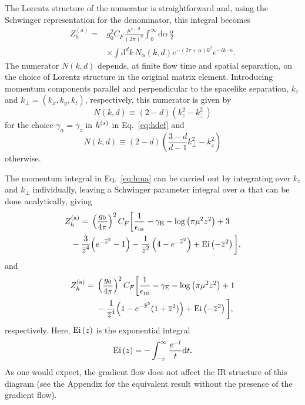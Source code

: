The Lorentz structure of the numerator is straightforward and, using the Schwinger representation for the denominator, this integral becomes
\begin{align}\label{eq:hma}
Z_h^{\mathrm{(a)}} = {} &  g_0^2C_F \frac{\mu^{4-d}}{(2\pi)^d} \int_0^\infty\mathrm{d}\alpha\,\frac{\alpha}{2} \nonumber \\
& \times \int \mathrm{d}^dk\, N_\alpha(k,d)e^{-(2\tau+\alpha) k^2} e^{-ik\cdot n}.
\end{align}
The numerator $N(k,d)$ depends, at finite flow time and spatial separation, on the choice of Lorentz structure in the original matrix element. Introducing momentum components parallel and perpendicular to the spacelike separation, $k_z$ and $k_\perp=(k_x,k_y,k_t)$, respectively, this numerator is given by
\begin{equation}
N(k,d) \equiv (2-d)(k_z^2-k_\perp^2)
\end{equation}
for the choice $\gamma_\alpha = \gamma_z$ in $h^{(s)}$ in Eq.~\eqref{eq:hdef} and
\begin{equation}
N(k,d) \equiv (2-d)\left(\displaystyle\frac{3-d}{d-1}k_\perp^2 - k_z^2\right)
\end{equation}
otherwise.

The momentum integral in Eq.~\eqref{eq:hma} can be carried out by integrating over $k_z$ and $k_\perp$ individually, leaving a Schwinger parameter integral over $\alpha$ that can be done analytically, giving
\begin{align}
Z_h^{\mathrm{(a)}} = {} & \left(\frac{g_0}{4\pi}\right)^2C_F\bigg[\frac{1}{\epsilon_{\scriptscriptstyle\mathrm{IR}}} -\gamma_{\mathrm{E}}-\log\left(\pi \mu^2z^2\right) +3\nonumber\\
{} - \frac{3}{\overline{z}^4} & \Big(e^{-\overline{z}^2}-1\Big)- \frac{1}{\overline{z}^2} \left(4-e^{-\overline{z}^2}\right)+\operatorname{Ei}\left(-\overline{z}^2\right)\bigg], \label{eq:hta1}
\end{align}
and
\begin{align}
Z_h^{\mathrm{(a)}} = {} &\left(\frac{g_0}{4\pi}\right)^2C_F \bigg[\frac{1}{\epsilon_{\scriptscriptstyle\mathrm{IR}}}-\gamma_{\mathrm{E}}-\log\left(\pi \mu^2z^2\right)+1\nonumber\\
&{} -\frac{1}{\overline{z}^4}\Big(1-e^{-\overline{z}^2}(1+\overline{z}^2)\Big)+\operatorname{Ei}\left(-\overline{z}^2\right) \bigg], \label{eq:hta2}
\end{align}
respectively. Here, $\operatorname{Ei}\left(z\right)$ is the exponential integral
\begin{equation}
\operatorname{Ei}\left(z\right) = -\int_{-z}^\infty \frac{e^{-t}}{t}\mathrm{d}t.
\end{equation}
As one would expect, the gradient flow does not affect the IR structure of this diagram (see the Appendix for the equivalent result without the presence of the gradient flow).

